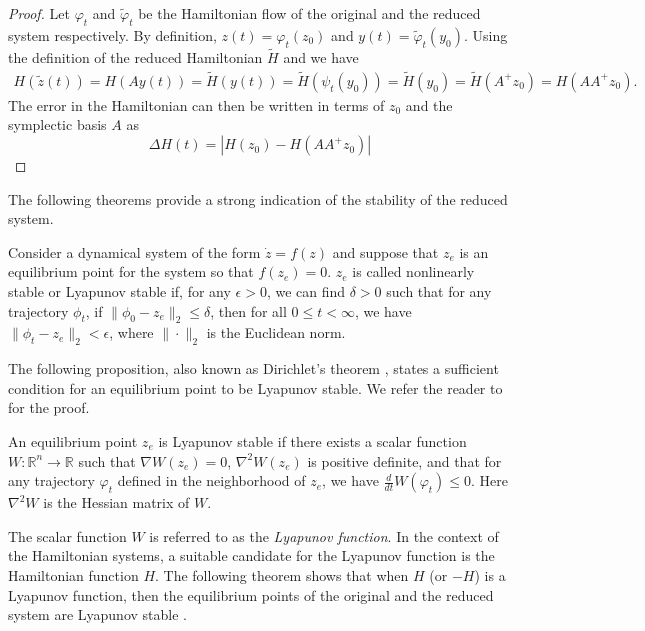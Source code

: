 \begin{proof}
	Let $\varphi_t$ and $\tilde \varphi_t$ be the Hamiltonian flow of the original and the reduced system respectively. By definition, $ z(t) = \varphi_t(z_0)$ and $ y(t) = \tilde \varphi_t(y_0)$. Using the definition of the reduced Hamiltonian $\tilde H$ and  we have
\begin{equation} \label{p1.eq:SyMo:6}
\begin{aligned}
	H(\tilde{{z}} (t)) = H( A y (t) ) = \tilde H( y (t)) = \tilde H(\psi_t( y_0)) = \tilde H( y_0) = \tilde H(A^+  z_0) = H(AA^+ z_0).
\end{aligned}
\end{equation}
The error in the Hamiltonian can then be written in terms of $z_0$ and the symplectic basis $A$ as
\begin{equation} \label{p1.eq:SyMo:7}
	\Delta H(t) = |H(z_0) - H(AA^+ z_0)|
\end{equation}
\end{proof}
The following theorems provide a strong indication of the stability of the reduced system.

\begin{definition} \label{p1.definition:SyMo:1} \cite{bhatia2002stability}
Consider a dynamical system of the form $\dot{z} = f(z)$ and suppose that $z_e$ is an equilibrium point for the system so that $f(z_e) = 0$. $ z_e$ is called nonlinearly stable or Lyapunov stable if, for any $\epsilon > 0$, we can find $\delta > 0$ such that for any trajectory $\phi_t$, if $\| \phi_0 -  z_e \|_2 \leq \delta$, then for all $0 \leq t < \infty$, we have $\| \phi_t -  z_e \|_2 < \epsilon$, where $\| \cdot \|_2$ is the Euclidean norm.
\end{definition}	
The following proposition, also known as Dirichlet's theorem \cite{bhatia2002stability}, states a sufficient condition for an equilibrium point to be Lyapunov stable. We refer the reader to \cite{bhatia2002stability} for the proof.
\begin{proposition} \label{p1.proposition:SyMo:1} \cite{bhatia2002stability}
An equilibrium point $ z_e$ is Lyapunov stable if there exists a scalar function $W : \mathbb R^{n} \to  \mathbb R$ such that $\nabla W( z_e) = 0$, $\nabla^2 W(z_e)$ is positive definite, and that for any trajectory $\varphi_t$ defined in the neighborhood of $ z_e$, we have $\frac{d}{dt} W(\varphi_t) \leq 0$. Here $\nabla^2W$ is the Hessian matrix of $W$.
\end{proposition}
The scalar function $W$ is referred to as the \emph{Lyapunov function}. In the context of the Hamiltonian systems, a suitable candidate for the Lyapunov function is the Hamiltonian function $H$. The following theorem shows that when $H$ (or $-H$) is a Lyapunov function, then the equilibrium points of the original and the reduced system are Lyapunov stable \cite{abraham1978foundations}. 


